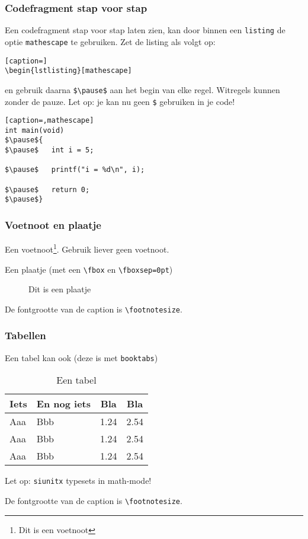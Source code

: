 \documentclass[fleqn,aspectratio=169,dutch,10pt]{beamer}
\begin{document}
\begin{frame}[fragile]
\frametitle{Codefragment stap voor stap}
Een codefragment stap voor stap laten zien, kan door binnen een \lstinline|listing| de optie \lstinline|mathescape| te gebruiken. Zet de listing als volgt op:
\begin{lstlisting}[caption=]
\begin{lstlisting}[mathescape]
\end{lstlisting}
en gebruik daarna \lstinline|$\pause$| aan het begin van elke regel. Witregels kunnen zonder de pauze. Let op: je kan nu geen \lstinline|$| gebruiken in je code!
\begin{lstlisting}[caption=,mathescape]
int main(void)
$\pause${
$\pause$   int i = 5;

$\pause$   printf("i = %d\n", i);

$\pause$   return 0;
$\pause$}
\end{lstlisting}
\end{frame}


\begin{frame}[fragile]
\frametitle{Voetnoot en plaatje}
Een voetnoot\footnote{Dit is een voetnoot}. Gebruik liever geen voetnoot.

Een plaatje (met een \lstinline|\fbox| en \lstinline|\fboxsep=0pt|)

\begin{figure}
\fboxsep=0pt
\fbox{\resizebox{0.30\paperwidth}{!}{\beamerthemethuaslogo}}
\caption{Dit is een plaatje}
\end{figure}

De fontgrootte van de caption is \lstinline|\footnotesize|.

\end{frame}


\begin{frame}[fragile]
\frametitle{Tabellen}
Een tabel kan ook (deze is met \texttt{booktabs})

\begin{table}[!ht]
\caption{Een tabel}
\begin{tabular}{llcc}
\toprule
Iets & En nog iets & Bla & Bla \\
\midrule
Aaa & Bbb & 1.24 & 2.54 \\
Aaa & Bbb & 1.24 & 2.54 \\
Aaa & Bbb & 1.24 & 2.54 \\
\bottomrule
\end{tabular}
\end{table}

Let op: \texttt{siunitx} typesets in math-mode!

De fontgrootte van de caption is \lstinline|\footnotesize|.
\end{frame}
\end{document}
